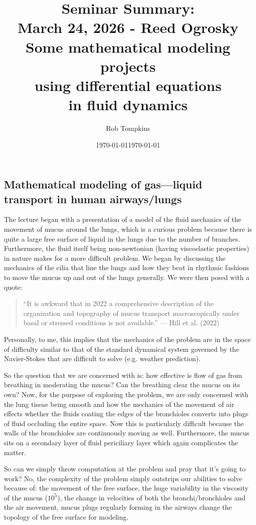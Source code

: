 \documentclass[12pt]{amsart}
\title{Seminar Summary:\\March 24, 2026 - Reed Ogrosky\\Some mathematical modeling projects\\ using differential equations\\ in fluid dynamics}
\author{Rob Tompkins}
\date{\today}
\theoremstyle{definition}
\theoremstyle{question}
\begin{document}
    \maketitle
    \date{\today}
    \begin{onehalfspace}
        \section{Mathematical modeling of gas---liquid transport in human airways/lungs}
        The lecture began with a presentation of a model of the fluid mechanics of the movement of mucus around the lungs,
        which is a curious problem because there is quite a large free surface of liquid in the lungs due to the number of branches.
        Furthermore, the fluid itself being non-newtonian (having viscoelastic properties) in nature makes for a more difficult problem.
        We began by discussing the mechanics of the cilia that line the lungs and how they beat in rhythmic fashions
        to move the mucus up and out of the lungs generally.
        We were then posed with a quote:
        \begin{quote}
            ``It is awkward that in 2022 a comprehensive description of the organization and topography of mucus
            transport macroscopically under basal or stressed conditions is not available.'' --- Hill et al. (2022)
        \end{quote}
        Personally, to me, this implies that the mechanics of the problem are in the space of difficulty similar to that
        of the standard dynamical system governed by the Navier-Stokes that are difficult to solve (e.g. weather prediction).

        So the question that we are concerned with is: how effective is flow of gas from breathing in moderating the mucus?
        Can the breathing clear the mucus on its own?
        Now, for the purpose of exploring the problem, we are only concerned with the lung tissue being smooth and how
        the mechanics of the movement of air effects whether the fluids coating the edges of the bronchioles converts into
        plugs of fluid occluding the entire space.
        Now this is particularly difficult because the walls of the bronchioles are continuously moving as well.
        Furthermore, the mucus sits on a secondary layer of fluid periciliary layer which again complicates the matter.

        So can we simply throw computation at the problem and pray that it's going to work?
        No, the complexity of the problem simply outstrips our abilities to solve because of: the movement of the free
        surface, the huge variability in the viscosity of the mucus ($10^5$), the change in velocities of both the
        bronchi/bronchioles and the air movement, mucus plugs regularly forming in the airways change the topology of the
        free surface for modeling.


\end{onehalfspace}
\end{document}
